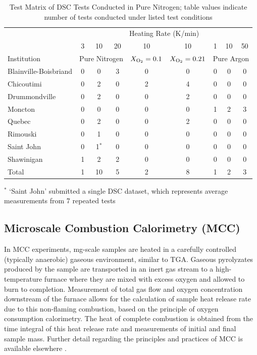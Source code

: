 \documentclass{book}
\begin{document}
\begin{table}[ht]
\caption{Test Matrix of DSC Tests Conducted in Pure Nitrogen; table values indicate number of tests conducted under listed test conditions}
\label{Table:Matrix_DSC}
\begin{center}
\begin{tabular}{lcccccccc}
							\hline
                      & \multicolumn{8}{c}{Heating Rate (K/min)} \\
                      & 3 & 10 & 20 & 10 & 10 & 1  & 10 & 50 \\
                      \hline
Institution           & \multicolumn{3}{c}{Pure Nitrogen} & $X_{\rm O_2}=0.1$ & $X_{\rm O_2}=0.21$ & \multicolumn{3}{c}{Pure Argon}  \\ \hline
Blainville-Boisbriand & 0 & 0     &     3 & 0 & 0 & 0 & 0 & 0 \\
Chicoutimi            & 0 & 2     &     0 & 2 & 4 & 0 & 0 & 0 \\
Drummondville         & 0 & 2     &     0 & 0 & 2 & 0 & 0 & 0 \\
Moncton               & 0 & 0     &     0 & 0 & 0 & 1 & 2 & 3 \\
Quebec                & 0 & 2     &     0 & 0 & 2 & 0 & 0 & 0 \\
Rimouski              & 0 & 1     &     0 & 0 & 0 & 0 & 0 & 0 \\
Saint John            & 0 & 1$^*$ &     0 & 0 & 0 & 0 & 0 & 0 \\
Shawinigan            & 1 & 2     &     2 & 0 & 0 & 0 & 0 & 0 \\ \hline
Total                 & 1 & 10    &     5 & 2 & 8 & 1 & 2 & 3 \\ \hline
\end{tabular}
\end{center}
$^*$ `Saint John' submitted a single DSC dataset, which represents average measurements from 7 repeated tests
\end{table}

\subsection{Microscale Combustion Calorimetry (MCC)}

In MCC experiments, mg-scale samples are heated in a carefully controlled (typically anaerobic) gaseous environment, similar to TGA. Gaseous pyrolyzates produced by the sample are transported in an inert gas stream to a high-temperature furnace where they are mixed with excess oxygen and allowed to burn to completion. Measurement of total gas flow and oxygen concentration downstream of the furnace allows for the calculation of sample heat release rate due to this non-flaming combustion, based on the principle of oxygen consumption calorimetry. The heat of complete combustion is obtained from the time integral of this heat release rate and measurements of initial and final sample mass. Further detail regarding the principles and practices of MCC is available elsewhere \cite{lyon2013principles}.
\end{document}
